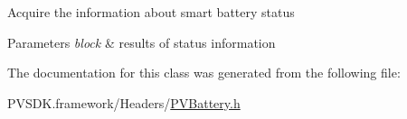 Acquire the information about smart battery status


\begin{DoxyParams}{Parameters}
{\em block} & results of status information \\
\hline
\end{DoxyParams}


The documentation for this class was generated from the following file\+:\begin{DoxyCompactItemize}
\item 
P\+V\+S\+D\+K.\+framework/\+Headers/\hyperlink{_p_v_battery_8h}{P\+V\+Battery.\+h}\end{DoxyCompactItemize}
